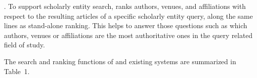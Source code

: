 . To support scholarly entity search, \oursystem ranks authors, venues, and affiliations with respect to the resulting articles of a specific scholarly entity query, along the same lines as stand-alone ranking. This helps to answer those questions such as which authors, venues or affiliations are the most authoritative ones in the query related field of study.




The search and ranking functions of \oursystem and existing systems are summarized in Table~1.



